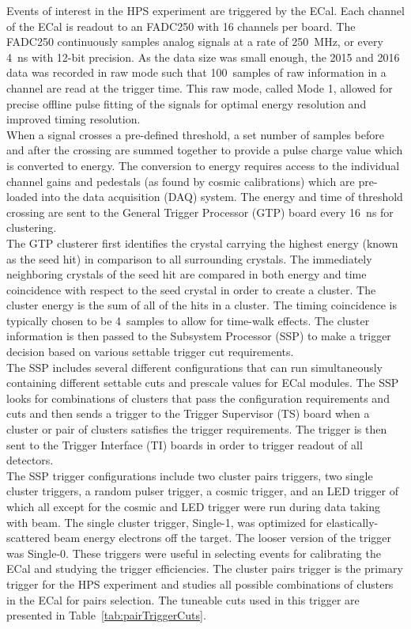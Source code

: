 Events of interest in the HPS experiment are triggered by the ECal. Each channel of the ECal is readout to an FADC250 with 16 channels per board. The FADC250 continuously samples analog signals at a rate of 250~MHz, or every 4~ns with 12-bit precision. As the data size was small enough, the 2015 and 2016 data was recorded in raw mode such that 100~samples of raw information in a channel are read at the trigger time. This raw mode, called Mode 1, allowed for precise offline pulse fitting of the signals for optimal energy resolution and improved timing resolution.\\
\indent When a signal crosses a pre-defined threshold, a set number of samples before and after the crossing are summed together to provide a pulse charge value which is converted to energy. The conversion to energy requires access to the individual channel gains and pedestals (as found by cosmic calibrations) which are pre-loaded into the data acquisition (DAQ) system. The energy and time of threshold crossing are sent to the General Trigger Processor (GTP) board every 16~ns  for clustering.~\cite{Balossino}\\
\indent The GTP clusterer first identifies the crystal carrying the highest energy (known as the seed hit) in comparison to all surrounding crystals. The immediately neighboring crystals of the seed hit are compared in both energy and time coincidence with respect to the seed crystal in order to create a cluster. The cluster energy is the sum of all of the hits in a cluster. The timing coincidence is typically chosen to be 4~samples to allow for time-walk effects. The cluster information is then passed to the Subsystem Processor (SSP) to make a trigger decision based on various settable trigger cut requirements. \\
\indent The SSP includes several different configurations that can run simultaneously containing different settable cuts and prescale values for ECal modules. The SSP looks for combinations of clusters that pass the configuration requirements and cuts and then sends a trigger to the Trigger Supervisor (TS) board when a cluster or pair of clusters satisfies the trigger requirements. The trigger is then sent to the Trigger Interface (TI) boards in order to trigger readout of all detectors.\\ 
\indent The SSP trigger configurations include two cluster pairs triggers, two single cluster triggers, a random pulser trigger, a cosmic trigger, and an LED trigger of which all except for the cosmic and LED trigger were run during data taking with beam. The single cluster trigger, Single-1, was optimized for elastically-scattered beam energy electrons off the target. The looser version of the trigger was Single-0. These triggers were useful in selecting events for calibrating the ECal and studying the trigger efficiencies. The cluster pairs trigger is the primary trigger for the HPS experiment and studies all possible combinations of clusters in the ECal for pairs selection. The tuneable cuts used in this trigger are presented in Table~\ref{tab:pairTriggerCuts}.~\cite{Balossino} 

